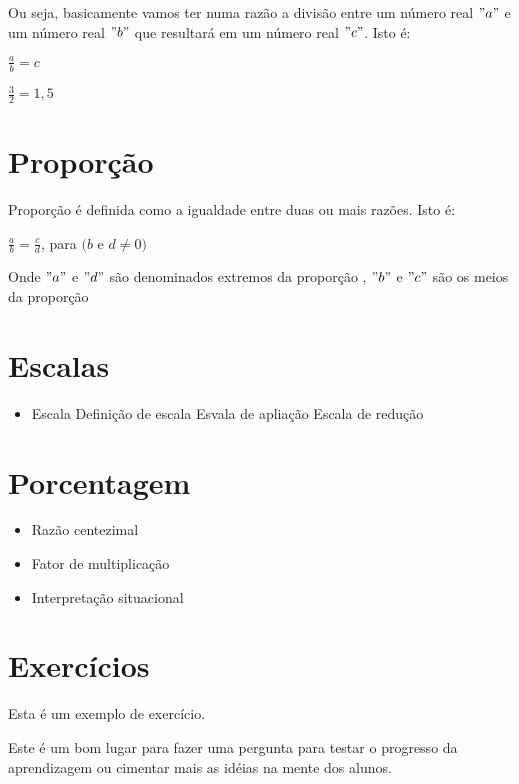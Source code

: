 \documentclass[11pt,fleqn]{book}
\begin{document}
\noindent Ou seja, basicamente vamos ter numa razão a divisão entre um número real $"a"$ e um número real $"b"$ que resultará em um número real $"c"$. Isto é:  

	\begin{center}
		$\frac{a}{b} = c$ 
	\end{center}
	
	\begin{example}
	   $\frac{3}{2} = 1,5$
	\end{example}

\section{Proporção}

Proporção é definida como a igualdade entre duas ou mais razões. Isto é:

	\begin{center}
	    $\frac{a}{b} = \frac{c}{d}$, para $(b$ e $d \neq 0)$
	\end{center}

Onde $"a"$ e $"d"$ são denominados extremos da proporção , $"b"$ e $"c"$ são os meios da proporção

\section{Escalas}

	\begin{itemize}
		\item Escala
		\subitem Definição de escala 
		\subitem Esvala de apliação
		\subitem Escala de redução
	\end{itemize}

\section{Porcentagem}
	\begin{itemize}
		\item Razão centezimal
		\item Fator de multiplicação
		\item Interpretação situacional
	\end{itemize}

\section{Exercícios}

Esta é um exemplo de exercício.

	\begin{exercise}
	Este é um bom lugar para fazer uma pergunta para testar o progresso da aprendizagem ou cimentar mais as idéias na mente dos alunos.
	\end{exercise}
\end{document}

